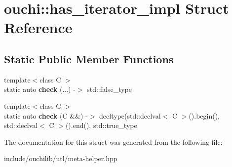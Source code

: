 \hypertarget{structouchi_1_1has__iterator__impl}{}\section{ouchi\+::has\+\_\+iterator\+\_\+impl Struct Reference}
\label{structouchi_1_1has__iterator__impl}
\subsection*{Static Public Member Functions}
\begin{DoxyCompactItemize}
\item 
\mbox{\label{structouchi_1_1has__iterator__impl_a36509f86ef363f62237e4b880bc45228}} 
{\footnotesize template$<$class C $>$ }\\static auto {\bfseries check} (...) -\/$>$ std\+::false\+\_\+type
\item 
\mbox{\label{structouchi_1_1has__iterator__impl_a152cafbcb005dc21196cad34947cce85}} 
{\footnotesize template$<$class C $>$ }\\static auto {\bfseries check} (C \&\&) -\/$>$ decltype(std\+::declval$<$ C $>$().begin(), std\+::declval$<$ C $>$().end(), std\+::true\+\_\+type
\end{DoxyCompactItemize}


The documentation for this struct was generated from the following file\+:\begin{DoxyCompactItemize}
\item 
include/ouchilib/utl/meta-\/helper.\+hpp\end{DoxyCompactItemize}
